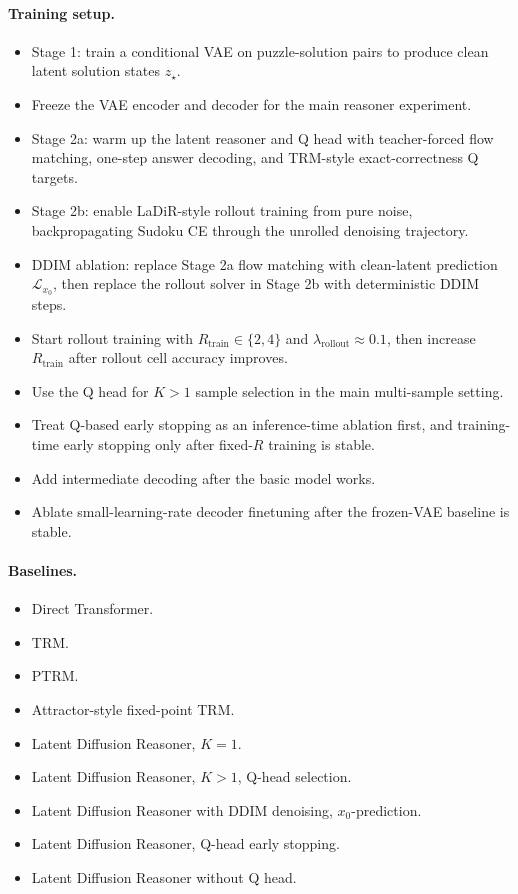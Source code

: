 \documentclass[11pt]{article}
\begin{document}
\paragraph{Training setup.}
\begin{itemize}[itemsep=0pt]
    \item Stage 1: train a conditional VAE on puzzle-solution pairs to produce clean latent solution states \(z_\star\).
    \item Freeze the VAE encoder and decoder for the main reasoner experiment.
    \item Stage 2a: warm up the latent reasoner and Q head with teacher-forced flow matching, one-step answer decoding, and TRM-style exact-correctness Q targets.
    \item Stage 2b: enable LaDiR-style rollout training from pure noise, backpropagating Sudoku CE through the unrolled denoising trajectory.
    \item DDIM ablation: replace Stage 2a flow matching with clean-latent prediction \(\mathcal L_{x_0}\), then replace the rollout solver in Stage 2b with deterministic DDIM steps.
    \item Start rollout training with \(R_{\mathrm{train}}\in\{2,4\}\) and \(\lambda_{\mathrm{rollout}}\approx 0.1\), then increase \(R_{\mathrm{train}}\) after rollout cell accuracy improves.
    \item Use the Q head for \(K>1\) sample selection in the main multi-sample setting.
    \item Treat Q-based early stopping as an inference-time ablation first, and training-time early stopping only after fixed-\(R\) training is stable.
    \item Add intermediate decoding after the basic model works.
    \item Ablate small-learning-rate decoder finetuning after the frozen-VAE baseline is stable.
\end{itemize}

\paragraph{Baselines.}
\begin{itemize}[itemsep=0pt]
    \item Direct Transformer.
    \item TRM.
    \item PTRM.
    \item Attractor-style fixed-point TRM.
    \item Latent Diffusion Reasoner, \(K=1\).
    \item Latent Diffusion Reasoner, \(K>1\), Q-head selection.
    \item Latent Diffusion Reasoner with DDIM denoising, \(x_0\)-prediction.
    \item Latent Diffusion Reasoner, Q-head early stopping.
    \item Latent Diffusion Reasoner without Q head.
\end{itemize}
\end{document}
